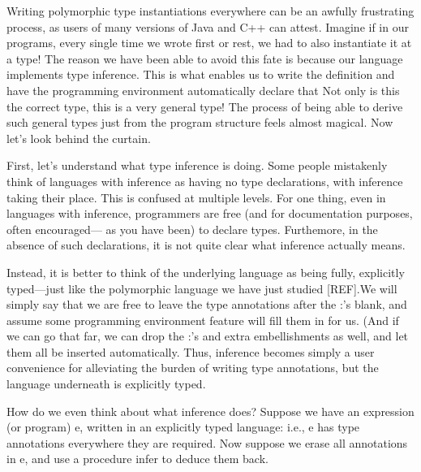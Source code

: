 
Writing polymorphic type instantiations everywhere can be an awfully frustrating process,
as users of many versions of Java and C++ can attest. Imagine if in our programs,
every single time we wrote first or rest, we had to also instantiate it at a type! The
reason we have been able to avoid this fate is because our language implements type
inference. This is what enables us to write the definition
and have the programming environment automatically declare that
Not only is this the correct type, this is a very general type! The process of being able
to derive such general types just from the program structure feels almost magical. Now
let’s look behind the curtain.

First, let’s understand what type inference is doing. Some people mistakenly think
of languages with inference as having no type declarations, with inference taking their
place. This is confused at multiple levels. For one thing, even in languages with
inference, programmers are free (and for documentation purposes, often encouraged—
as you have been) to declare types. Furthemore, in the absence of such declarations, it
is not quite clear what inference actually means.

Instead, it is better to think of the underlying language as being fully, explicitly
typed—just like the polymorphic language we have just studied [REF].We will simply
say that we are free to leave the type annotations after the :’s blank, and assume some
programming environment feature will fill them in for us. (And if we can go that far,
we can drop the :’s and extra embellishments as well, and let them all be inserted
automatically. Thus, inference becomes simply a user convenience for alleviating the
burden of writing type annotations, but the language underneath is explicitly typed.

How do we even think about what inference does? Suppose we have an expression
(or program) e, written in an explicitly typed language: i.e., e has type annotations
everywhere they are required. Now suppose we erase all annotations in e, and use a
procedure infer to deduce them back.


